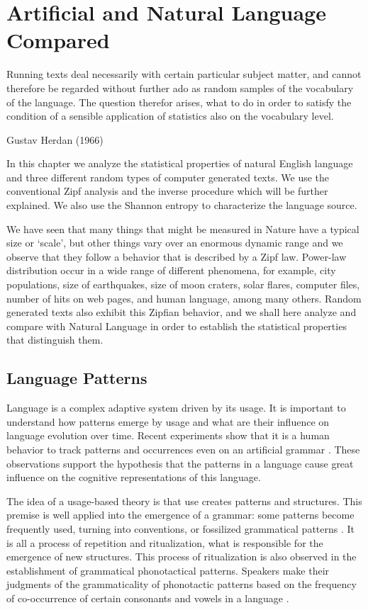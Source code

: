 \chapter{Artificial and Natural Language Compared}
\epigraph{Running texts deal necessarily with certain particular subject matter,
and cannot therefore be regarded without further ado as random samples of the
vocabulary of the language. The question therefor arises, what to do in order to
satisfy the condition of a sensible application of statistics also on the vocabulary level.}{Gustav Herdan (1966)}


In this chapter we analyze the statistical properties of natural English language
and three different random types of computer generated texts.
We use the conventional Zipf analysis and the inverse procedure which will be
further explained. We also use the Shannon entropy to characterize the language source.

We have seen that many things that might be measured in Nature have a typical
size or `scale', but other things vary over an enormous dynamic range and
we observe that they follow a behavior that is described by a Zipf law.
Power-law distribution occur in a wide range of different phenomena, for example,
city populations, size of earthquakes, size of moon craters, solar flares,
computer files, number of hits on web pages, and human language, among many
others. Random generated texts also exhibit this Zipfian behavior, and we
shall here analyze and compare with Natural Language in order to establish 
the statistical properties that distinguish them.



\section{Language Patterns}
Language is a complex adaptive system driven by its usage. It is important to understand
how patterns emerge by usage and what are their influence on language evolution over time.
Recent experiments show that it is a human behavior to track patterns and occurrences even on
an artificial grammar \citep{Saffran1996,Saffran1999,Saffran2003}. These observations
support the hypothesis that the patterns in a language cause great influence on the 
cognitive representations of this language.

The idea of a usage-based theory is that use creates patterns and structures. 
This premise is well applied into the emergence of a grammar: 
some patterns become frequently used, turning into conventions,
or fossilized grammatical patterns \citep{givon1979,hopper1980,hopper1984}. 
It is all a process of repetition and ritualization,
what is responsible for the emergence of new structures.
This process of ritualization is also observed in the establishment of grammatical phonotactical patterns.
Speakers make their judgments of the grammaticality of phonotactic patterns based on the frequency of 
co-occurrence of certain consonants and vowels in a language \citep{frisch1996,pierrehumbert1994}. 

